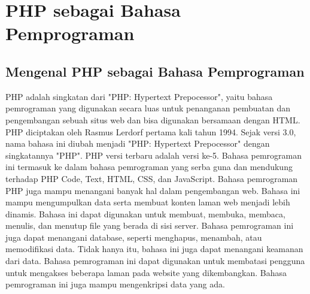 \section{PHP sebagai Bahasa Pemprograman}
\subsection{Mengenal PHP sebagai Bahasa Pemprograman}
PHP adalah singkatan dari "PHP: Hypertext Prepocessor", yaitu bahasa pemrograman yang digunakan secara luas untuk penanganan pembuatan dan pengembangan sebuah situs web dan bisa digunakan bersamaan dengan HTML. PHP diciptakan oleh Rasmus Lerdorf pertama kali tahun 1994. Sejak versi 3.0, nama bahasa ini diubah menjadi "PHP: Hypertext Prepocessor" dengan singkatannya "PHP". PHP versi terbaru adalah versi ke-5.
Bahasa pemrograman ini termasuk ke dalam bahasa pemrograman yang serba guna dan mendukung terhadap PHP Code, Text, HTML, CSS, dan JavaScript. Bahasa pemrograman PHP juga mampu menangani banyak hal dalam pengembangan web.
Bahasa ini mampu mengumpulkan data serta membuat konten laman web menjadi lebih dinamis. Bahasa ini dapat digunakan untuk membuat, membuka, membaca, menulis, dan menutup file yang berada di sisi server. Bahasa pemrograman ini juga dapat menangani database, seperti menghapus, menambah, atau memodifikasi data.
Tidak hanya itu, bahasa ini juga dapat menangani keamanan dari data. Bahasa pemrograman ini dapat digunakan untuk membatasi pengguna untuk mengakses beberapa laman pada website yang dikembangkan. Bahasa pemrograman ini juga mampu mengenkripsi data yang ada.

